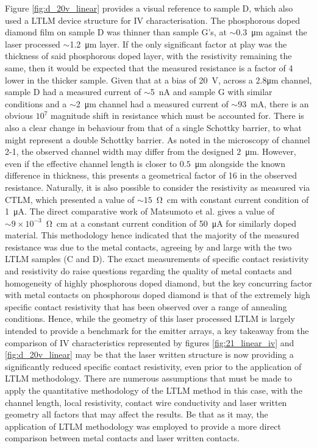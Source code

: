 \begin{refsection}
Figure \ref{fig:d_20v_linear} provides a visual reference to sample D, which also used a LTLM device structure for IV characterisation. The phosphorous doped diamond film on sample D was thinner than sample G's, at $\sim$0.3~\si{\micro\metre} against the laser processed $\sim$1.2~\si{\micro\metre} layer. If the only significant factor at play was the thickness of said phosphorous doped layer, with the resistivity remaining the same, then it would be expected that the measured resistance is a factor of 4 lower in the thicker sample. Given that at a bias of 20~\si{\volt}, across a 2.8\si{\micro\metre} channel, sample D had a measured current of $\sim$5~\si{\nano\ampere} and sample G with similar conditions and a $\sim$2~\si{\micro\metre} channel had a measured current of $\sim$93~\si{\milli\ampere}, there is an obvious $10^{7}$ magnitude shift in resistance which must be accounted for. There is also a clear change in behaviour from that of a single Schottky barrier, to what might represent a double Schottky barrier. As noted in the microscopy of channel 2-1, the observed channel width may differ from the designed $2$~\si{\micro\metre}. However, even if the effective channel length is closer to $0.5$~\si{\micro\metre} alongside the known difference in thickness, this presents a geometrical factor of 16 in the observed resistance. Naturally, it is also possible to consider the resistivity as measured via CTLM, which presented a value of $\sim15$~\si{\ohm\centi\metre} with constant current condition of 1~\si{\micro\ampere}. The direct comparative work of Matsumoto et al. \cite{matsumoto2013} gives a value of $\sim9\times10^{-3}$~\si{\ohm\centi\metre} at a constant current condition of 50~\si{\micro\ampere} for similarly doped material. This methodology hence indicated that the majority of the measured resistance was due to the metal contacts, agreeing by and large with the two LTLM samples (C and D). The exact measurements of specific contact resistivity and resistivity do raise questions regarding the quality of metal contacts and homogeneity of highly phosphorous doped diamond, but the key concurring factor with metal contacts on phosphorous doped diamond is that of the extremely high specific contact resistivity that has been observed over a range of annealing conditions. Hence, while the geometry of this laser processed LTLM is largely intended to provide a benchmark for the emitter arrays, a key takeaway from the comparison of IV characteristics represented by figures \ref{fig:21_linear_iv} and \ref{fig:d_20v_linear} may be that the laser written structure is now providing a significantly reduced specific contact resistivity, even prior to the application of LTLM methodology. There are numerous assumptions that must be made to apply the quantitative methodology of the LTLM method in this case, with the channel length, local resistivity, contact wire conductivity and laser written geometry all factors that may affect the results. Be that as it may, the application of LTLM methodology was employed to provide a more direct comparison between metal contacts and laser written contacts.


\end{refsection}
